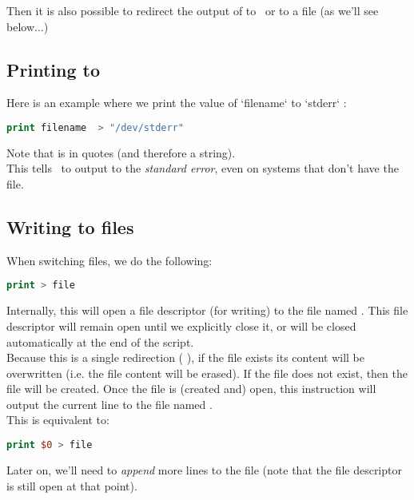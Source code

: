 Then it is also possible to redirect the output of  to \stderr\ or to a file (as we'll see below...)





\subsection*{Printing to \stderr}

Here is an example where we print the value of `filename` to `stderr` :
\begin{lstlisting}[language=awk]
print filename  > "/dev/stderr"
\end{lstlisting}

Note that  is in quotes (and therefore a string). \\

This tells \gawk\ to output to the \emph{standard error}, even on systems that don't have the  file.



\subsection*{Writing to files}

When switching files, we do the following:
\begin{lstlisting}[language=awk]
print > file
\end{lstlisting}

Internally, this will open a file descriptor (for writing) to the file named . This file descriptor will remain open until we explicitly close it, or will be closed automatically at the end of the script. \\

Because this is a single redirection ( \cmd{>} ), if the file exists its content will be overwritten (i.e. the file content will be erased). If the file does not exist, then the file will be created. Once the file is (created and) open, this instruction will output the current line to the file named . \\

This is equivalent to:
\begin{lstlisting}[language=awk]
print $0 > file
\end{lstlisting}

\medskip


Later on, we'll need to \emph{append} more lines to the file (note that the file descriptor is still open at that point).

